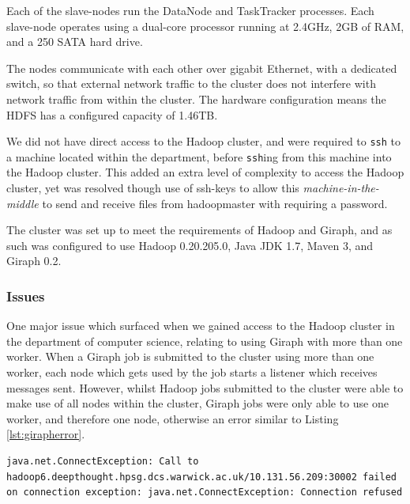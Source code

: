 Each of the slave-nodes run the DataNode and TaskTracker processes. Each slave-node operates using a dual-core processor running at 2.4GHz, 2GB of RAM, and a 250 SATA hard drive.

The nodes communicate with each other over gigabit Ethernet, with a dedicated switch, so that external network traffic to the cluster does not interfere with network traffic from within the cluster. The hardware configuration means the HDFS has a configured capacity of 1.46TB.

We did not have direct access to the Hadoop cluster, and were required to {\tt ssh} to a machine located within the department, before {\tt ssh}ing from this machine into the Hadoop cluster. This added an extra level of complexity to access the Hadoop cluster, yet was resolved though use of ssh-keys to allow this \emph{machine-in-the-middle} to send and receive files from hadoopmaster with requiring a password.

The cluster was set up to meet the requirements of Hadoop and Giraph, and as such was configured to use Hadoop 0.20.205.0, Java JDK 1.7, Maven 3, and Giraph 0.2.

\subsubsection{Issues}
One major issue which surfaced when we gained access to the Hadoop cluster in the department of computer science, relating to using Giraph with more than one worker. When a Giraph job is submitted to the cluster using more than one worker, each node which gets used by the job starts a listener which receives messages sent. However, whilst Hadoop jobs submitted to the cluster were able to make use of all nodes within the cluster, Giraph jobs were only able to use one worker, and therefore one node, otherwise an error similar to Listing \ref{lst:girapherror}.

\begin{lstlisting}[float]
java.net.ConnectException: Call to hadoop6.deepthought.hpsg.dcs.warwick.ac.uk/10.131.56.209:30002 failed on connection exception: java.net.ConnectException: Connection refused
\end{lstlisting}

